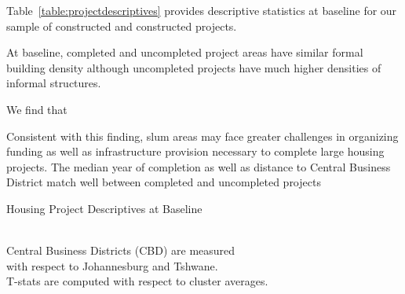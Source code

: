 \documentclass[12pt]{article}
\begin{document}




Table~\ref{table:projectdescriptives} provides descriptive statistics at baseline for our sample of  constructed and  constructed projects.  

At baseline, completed and uncompleted project areas have similar formal building density although uncompleted projects have much higher densities of informal structures.  

We find that 

Consistent with this finding, slum areas may face greater challenges in organizing funding as well as infrastructure provision necessary to complete large housing projects.   The median year of completion as well as distance to Central Business District match well between completed and uncompleted projects 

\begin{table}
	\centering
	\caption{Housing Project Descriptives at Baseline}\label{table:projectdescriptives}
%
\\
\vspace{.2cm}
\footnotesize{Central Business Districts (CBD) are measured \\
with respect to Johannesburg and Tshwane.  \\ T-stats are computed with respect to cluster averages.}
\end{table}
\end{document}
